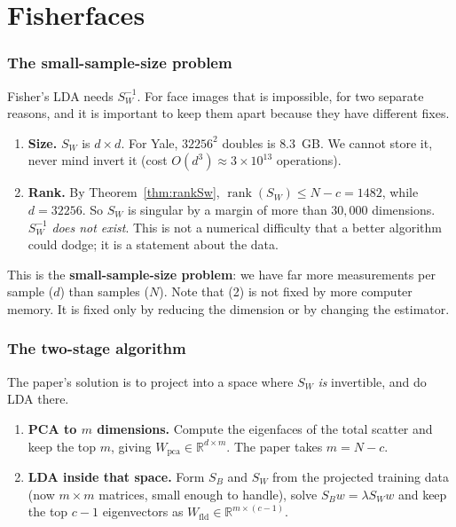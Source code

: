 \documentclass[11pt]{article}
\theoremstyle{definition}
\theoremstyle{remark}
\newcommand{\Sw}{S_W}
\newcommand{\Sb}{S_B}
\newcommand{\R}{\mathbb{R}}
\newcommand{\rank}{\operatorname{rank}}
\begin{document}
\part{Fisherfaces}

\section{The small-sample-size problem}

Fisher's LDA needs $\Sw^{-1}$. For face images that is impossible, for two separate
reasons, and it is important to keep them apart because they have different fixes.

\begin{enumerate}[label=(\arabic*)]
\item \textbf{Size.} $\Sw$ is $d\times d$. For Yale, $32256^2$ doubles is
  $\mathbf{8.3}$~GB. We cannot store it, never mind invert it (cost $O(d^3)
  \approx 3\times10^{13}$ operations).
\item \textbf{Rank.} By Theorem~\ref{thm:rankSw}, $\rank(\Sw)\le N-c = 1482$,
  while $d=32256$. So $\Sw$ is singular by a margin of more than $30{,}000$
  dimensions. $\Sw^{-1}$ \emph{does not exist}. This is not a numerical difficulty
  that a better algorithm could dodge; it is a statement about the data.
\end{enumerate}

This is the \textbf{small-sample-size problem}: we have far more measurements per
sample ($d$) than samples ($N$). Note that (2) is not fixed by more computer
memory. It is fixed only by reducing the dimension or by changing the estimator.

\section{The two-stage algorithm}

The paper's solution is to project into a space where $\Sw$ \emph{is} invertible,
and do LDA there.

\begin{enumerate}[label=\textbf{Stage \arabic*.},leftmargin=*]
\item \textbf{PCA to $m$ dimensions.} Compute the eigenfaces of the total scatter
  and keep the top $m$, giving $W_{\text{pca}}\in\R^{d\times m}$. The paper takes
  $m=N-c$.
\item \textbf{LDA inside that space.} Form $\Sb$ and $\Sw$ from the projected
  training data (now $m\times m$ matrices, small enough to handle), solve
  $\Sb w=\lambda\Sw w$ and keep the top $c-1$ eigenvectors as
  $W_{\text{fld}}\in\R^{m\times(c-1)}$.
\end{enumerate}
\end{document}
